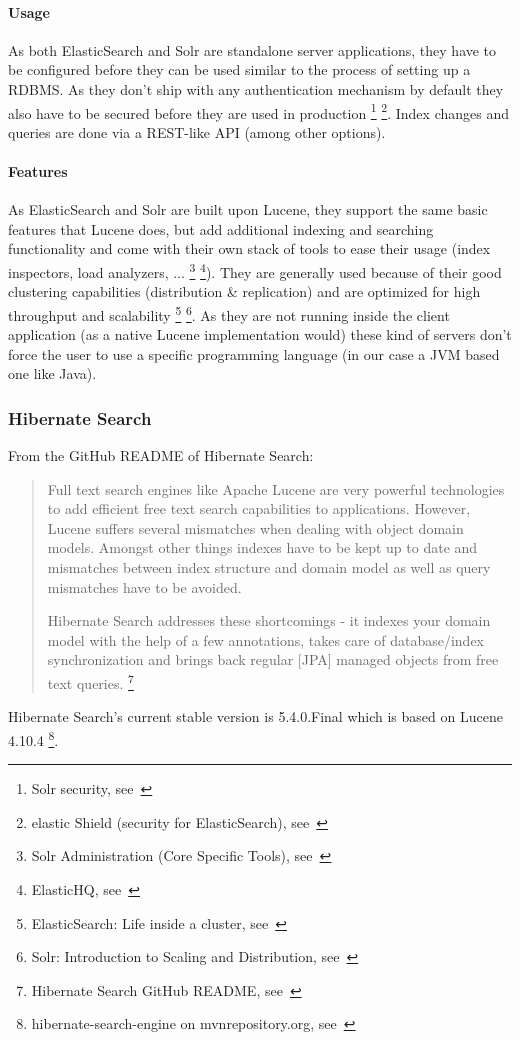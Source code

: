 \paragraph{Usage}
As both ElasticSearch and Solr are standalone server applications, they have to be configured before they can be used similar to the process of setting up a RDBMS. As they don't ship with any authentication mechanism by default they also have to be secured before they are used in production \footnote{Solr security, see~\cite{solr_security}} \footnote{elastic Shield (security for ElasticSearch), see~\cite{elasticsearch_security}}. Index changes and queries are done via a REST-like API (among other options).

\paragraph{Features}
As ElasticSearch and Solr are built upon Lucene, they support the same basic features that Lucene does, but add additional indexing and searching functionality and come with their own stack of tools to ease their usage (index inspectors, load analyzers, ... \footnote{Solr Administration (Core Specific Tools), see~\cite{solr_admin}} \footnote{ElasticHQ, see~\cite{elasticsearch_admin}}). They are generally used because of their good clustering capabilities (distribution \& replication) and are optimized for high throughput and scalability \footnote{ElasticSearch: Life inside a cluster, see~\cite{elasticsearch_clustering}} \footnote{Solr: Introduction to Scaling and Distribution, see~\cite{solr_clustering}}. As they are not running inside the client application (as a native Lucene implementation would) these kind of servers don't force the user to use a specific programming language (in our case a JVM based one like Java).

\pagebreak

\subsubsection{Hibernate Search}

From the GitHub README of Hibernate Search:
\begin{quote}
Full text search engines like Apache Lucene are very powerful technologies to add efficient free text search capabilities to applications. However, Lucene suffers several mismatches when dealing with object domain models. Amongst other things indexes have to be kept up to date and mismatches between index structure and domain model as well as query mismatches have to be avoided.

Hibernate Search addresses these shortcomings - it indexes your domain model with the help of a few annotations, takes care of database/index synchronization and brings back regular [JPA] managed objects from free text queries. \footnote{Hibernate Search GitHub README, see~\cite{hsearch_source_code_git}}
\end{quote}
\noindent
Hibernate Search's current stable version is 5.4.0.Final which is based on Lucene 4.10.4 \footnote{hibernate-search-engine on mvnrepository.org, see~\cite{hibernate_search_engine_mvnrepository}}.

